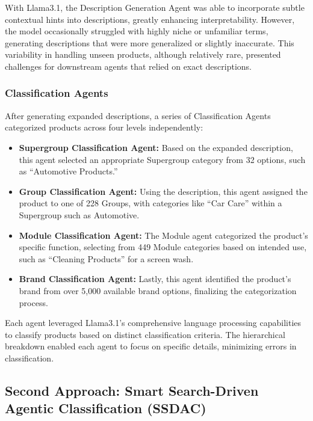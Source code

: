 \documentclass[9pt,a4paper,twoside]{rho-class/rho}
\begin{document}
With Llama3.1, the Description Generation Agent was able to incorporate subtle contextual hints into descriptions, greatly enhancing interpretability. However, the model occasionally struggled with highly niche or unfamiliar terms, generating descriptions that were more generalized or slightly inaccurate. This variability in handling unseen products, although relatively rare, presented challenges for downstream agents that relied on exact descriptions.

\subsubsection{Classification Agents}
After generating expanded descriptions, a series of Classification Agents categorized products across four levels independently:
\begin{itemize}
    \item \textbf{Supergroup Classification Agent:} Based on the expanded description, this agent selected an appropriate Supergroup category from 32 options, such as “Automotive Products.”
    \item \textbf{Group Classification Agent:} Using the description, this agent assigned the product to one of 228 Groups, with categories like “Car Care” within a Supergroup such as Automotive.
    \item \textbf{Module Classification Agent:} The Module agent categorized the product’s specific function, selecting from 449 Module categories based on intended use, such as “Cleaning Products” for a screen wash.
    \item \textbf{Brand Classification Agent:} Lastly, this agent identified the product’s brand from over 5,000 available brand options, finalizing the categorization process.
\end{itemize}

Each agent leveraged Llama3.1’s comprehensive language processing capabilities to classify products based on distinct classification criteria. The hierarchical breakdown enabled each agent to focus on specific details, minimizing errors in classification.

\subsection{Second Approach: Smart Search-Driven Agentic Classification (SSDAC)}
\end{document}
